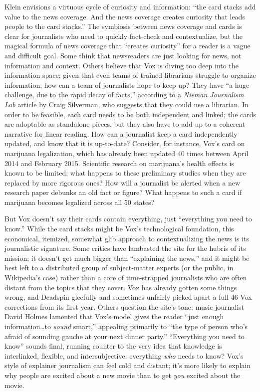 Klein envisions a virtuous cycle of curiosity and information: ``the card stacks add value to the news coverage. And the news coverage creates curiosity that leads people to the card stacks.''\autocite{coscarelli_ezra_2014} The symbiosis between news coverage and cards is clear for journalists who need to quickly fact-check and contextualize, but the magical formula of news coverage that ``creates curiosity'' for a reader is a vague and difficult goal. Some think that newsreaders are just looking for news, not information and context. Others believe that Vox is diving too deep into the information space; given that even teams of trained librarians struggle to organize information, how can a team of journalists hope to keep up? They have ``a huge challenge, due to the rapid decay of facts,'' according to a \emph{Nieman Journalism Lab} article by Craig Silverman, who suggests that they could use a librarian.\autocite{silverman_why_2014} In order to be feasible, each card needs to be both independent and linked; the cards are adoptable as standalone pieces, but they also have to add up to a coherent narrative for linear reading. How can a journalist keep a card independently updated, and know that it is up-to-date? Consider, for instance, Vox's card on marijuana legalization, which has already been updated 40 times between April 2014 and February 2015.\autocite{lopez_everything_????} Scientific research on marijuana's health effects is known to be limited; what happens to these preliminary studies when they are replaced by more rigorous ones? How will a journalist be alerted when a new research paper debunks an old fact or figure? What happens to such a card if marijuana becomes legalized across all 50 states?

But Vox doesn't say their cards contain everything, just ``everything you need to know.'' While the card stacks might be Vox's technological foundation, this economical, itemized, somewhat glib approach to contextualizing the news is its journalistic signature. Some critics have lambasted the site for the hubris of its mission; it doesn't get much bigger than ``explaining the news,'' and it might be best left to a distributed group of subject-matter experts (or the public, in Wikipedia's case) rather than a core of time-strapped journalists who are often distant from the topics that they cover. Vox has already gotten some things wrong, and Deadspin gleefully and sometimes unfairly picked apart a full 46 Vox corrections from its first year.\autocite{draper_46_2014} Others question the site's tone; music journalist David Holmes lamented that Vox's model gives the reader ``just enough information\ldots to \emph{sound} smart,'' appealing primarily to ``the type of person who's afraid of sounding gauche at your next dinner party.''\autocite{homes_how_2015} ``Everything you need to know'' sounds final, running counter to the very idea that knowledge is interlinked, flexible, and intersubjective: everything \emph{who} needs to know? Vox's style of explainer journalism can feel cold and distant; it's more likely to explain why people are excited about a new movie than to get \emph{you} excited about the movie.

